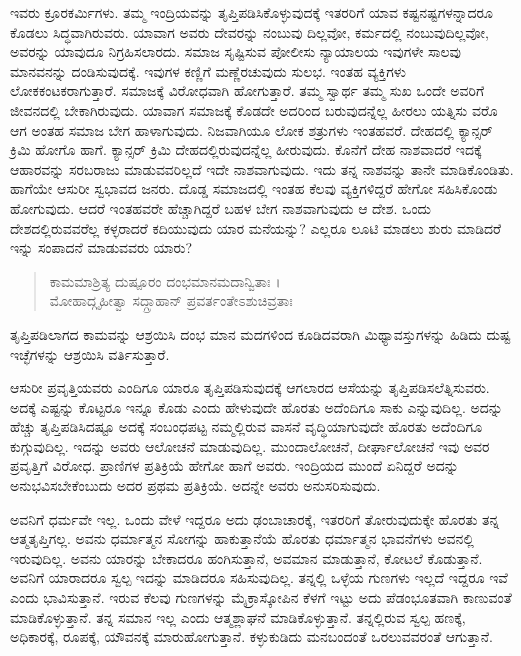 ಇವರು ಕ್ರೂರಕರ್ಮಿಗಳು. ತಮ್ಮ ಇಂದ್ರಿಯವನ್ನು ತೃಪ್ತಿಪಡಿಸಿಕೊಳ್ಳುವುದಕ್ಕೆ ಇತರರಿಗೆ ಯಾವ ಕಷ್ಟನಷ್ಟಗಳನ್ನಾದರೂ ಕೊಡಲು ಸಿದ್ಧವಾಗಿರುವರು. ಯಾವಾಗ ಅವರು ದೇವರನ್ನು ನಂಬುವು ದಿಲ್ಲವೋ, ಕರ್ಮದಲ್ಲಿ ನಂಬುವುದಿಲ್ಲವೋ, ಅವರನ್ನು ಯಾವುದೂ ನಿಗ್ರಹಿಸಲಾರದು. ಸಮಾಜ ಸೃಷ್ಟಿಸುವ ಪೋಲೀಸು ನ್ಯಾಯಾಲಯ ಇವುಗಳೇ ಸಾಲವು ಮಾನವನನ್ನು ದಂಡಿಸುವುದಕ್ಕೆ. ಇವುಗಳ ಕಣ್ಣಿಗೆ ಮಣ್ಣೆರಚುವುದು ಸುಲಭ. ಇಂತಹ ವ್ಯಕ್ತಿಗಳು ಲೋಕಕಂಟಕರಾಗುತ್ತಾರೆ. ಸಮಾಜಕ್ಕೆ ವಿರೋಧವಾಗಿ ಹೋಗುತ್ತಾರೆ. ತಮ್ಮ ಸ್ವಾರ್ಥ ತಮ್ಮ ಸುಖ ಒಂದೇ ಅವರಿಗೆ ಜೀವನದಲ್ಲಿ ಬೇಕಾಗಿರುವುದು. ಯಾವಾಗ ಸಮಾಜಕ್ಕೆ ಕೊಡದೇ ಅದರಿಂದ ಬರುವುದನ್ನೆಲ್ಲ ಹೀರಲು ಯತ್ನಿಸು ವರೊ ಆಗ ಅಂತಹ ಸಮಾಜ ಬೇಗ ಹಾಳಾಗುವುದು. ನಿಜವಾಗಿಯೂ ಲೋಕ ಶತ್ರುಗಳು ಇಂತಹವರೆ. ದೇಹದಲ್ಲಿ ಕ್ಯಾನ್ಸರ್ ಕ್ರಿಮಿ ಹೋಗೊ ಹಾಗೆ. ಕ್ಯಾನ್ಸರ್ ಕ್ರಿಮಿ ದೇಹದಲ್ಲಿರುವುದನ್ನೆಲ್ಲ ಹೀರುವುದು. ಕೊನೆಗೆ ದೇಹ ನಾಶವಾದರೆ ಇದಕ್ಕೆ ಆಹಾರವನ್ನು ಸರಬರಾಜು ಮಾಡುವವರಿಲ್ಲದೆ ಇದೇ ನಾಶವಾಗುವುದು. ಇದು ತನ್ನ ನಾಶವನ್ನು ತಾನೇ ಮಾಡಿಕೊಂಡಿತು. ಹಾಗೆಯೇ ಆಸುರೀ ಸ್ವಭಾವದ ಜನರು. ದೊಡ್ಡ ಸಮಾಜದಲ್ಲಿ ಇಂತಹ ಕೆಲವು ವ್ಯಕ್ತಿಗಳಿದ್ದರೆ ಹೇಗೋ ಸಹಿಸಿಕೊಂಡು ಹೋಗುವುದು. ಆದರೆ ಇಂತಹವರೇ ಹೆಚ್ಚಾಗಿದ್ದರೆ ಬಹಳ ಬೇಗ ನಾಶವಾಗುವುದು ಆ ದೇಶ. ಒಂದು ದೇಶದಲ್ಲಿರುವವರೆಲ್ಲ ಕಳ್ಳರಾದರೆ ಕದಿಯುವುದು ಯಾರ ಮನೆಯನ್ನು? ಎಲ್ಲರೂ ಲೂಟಿ ಮಾಡಲು ಶುರು ಮಾಡಿದರೆ ಇನ್ನು ಸಂಪಾದನೆ ಮಾಡುವವರು ಯಾರು?

\begin{verse}
ಕಾಮಮಾಶ್ರಿತ್ಯ ದುಷ್ಪೂರಂ ದಂಭಮಾನಮದಾನ್ವಿತಾಃ ।\\ಮೋಹಾದ್ಗೃಹೀತ್ವಾ ಸದ್ಗ್ರಾಹಾನ್ ಪ್ರವರ್ತಂತೇಽಶುಚಿವ್ರತಾಃ 
\end{verse}

{\small ತೃಪ್ತಿಪಡಿಲಾಗದ ಕಾಮವನ್ನು ಆಶ್ರಯಿಸಿ ದಂಭ ಮಾನ ಮದಗಳಿಂದ ಕೂಡಿದವರಾಗಿ ಮಿಥ್ಯಾವಸ್ತುಗಳನ್ನು ಹಿಡಿದು ದುಷ್ಟ ಇಚ್ಛೆಗಳನ್ನು ಆಶ್ರಯಿಸಿ ವರ್ತಿಸುತ್ತಾರೆ.}

ಆಸುರೀ ಪ್ರವೃತ್ತಿಯವರು ಎಂದಿಗೂ ಯಾರೂ ತೃಪ್ತಿಪಡಿಸುವುದಕ್ಕೆ ಆಗಲಾರದ ಆಸೆಯನ್ನು ತೃಪ್ತಿಪಡಿಸಲೆತ್ನಿಸುವರು. ಅದಕ್ಕೆ ಎಷ್ಟನ್ನು ಕೊಟ್ಟರೂ ಇನ್ನೂ ಕೊಡು ಎಂದು ಹೇಳುವುದೇ ಹೊರತು ಅದೆಂದಿಗೂ ಸಾಕು ಎನ್ನುವುದಿಲ್ಲ. ಅದನ್ನು ಹೆಚ್ಚು ತೃಪ್ತಿಪಡಿಸಿದಷ್ಟೂ ಅದಕ್ಕೆ ಸಂಬಂಧಪಟ್ಟ ನಮ್ಮಲ್ಲಿರುವ ವಾಸನೆ ವೃದ್ಧಿಯಾಗುವುದೇ ಹೊರತು ಅದೆಂದಿಗೂ ಕುಗ್ಗುವುದಿಲ್ಲ. ಇದನ್ನು ಅವರು ಆಲೋಚನೆ ಮಾಡುವುದಿಲ್ಲ. ಮುಂದಾಲೋಚನೆ, ದೀರ್ಘಾಲೋಚನೆ ಇವು ಅವರ ಪ್ರವೃತ್ತಿಗೆ ವಿರೋಧ. ಪ್ರಾಣಿಗಳ ಪ್ರತಿಕ್ರಿಯೆ ಹೇಗೋ ಹಾಗೆ ಅವರು. ಇಂದ್ರಿಯದ ಮುಂದೆ ಏನಿದ್ದರೆ ಅದನ್ನು ಅನುಭವಿಸಬೇಕೆಂಬುದು ಅದರ ಪ್ರಥಮ ಪ್ರತಿಕ್ರಿಯೆ. ಅದನ್ನೇ ಅವರು ಅನುಸರಿಸುವುದು.

ಅವನಿಗೆ ಧರ್ಮವೇ ಇಲ್ಲ. ಒಂದು ವೇಳೆ ಇದ್ದರೂ ಅದು ಢಂಬಾಚಾರಕ್ಕೆ, ಇತರರಿಗೆ ತೋರುವುದುಕ್ಕೇ ಹೊರತು ತನ್ನ ಆತ್ಮತೃಪ್ತಿಗಲ್ಲ. ಅವನು ಧರ್ಮಾತ್ಮನ ಸೋಗನ್ನು ಹಾಕುತ್ತಾನೆಯೆ ಹೊರತು ಧರ್ಮಾತ್ಮನ ಭಾವನೆಗಳು ಅವನಲ್ಲಿ ಇರುವುದಿಲ್ಲ. ಅವನು ಯಾರನ್ನು ಬೇಕಾದರೂ ಹಂಗಿಸುತ್ತಾನೆ, ಅವಮಾನ ಮಾಡುತ್ತಾನೆ, ಕೋಟಲೆ ಕೊಡುತ್ತಾನೆ. ಅವನಿಗೆ ಯಾರಾದರೂ ಸ್ವಲ್ಪ ಇದನ್ನು ಮಾಡಿದರೂ ಸಹಿಸುವುದಿಲ್ಲ. ತನ್ನಲ್ಲಿ ಒಳ್ಳೆಯ ಗುಣಗಳು ಇಲ್ಲದೆ ಇದ್ದರೂ ಇವೆ ಎಂದು ಭಾವಿಸುತ್ತಾನೆ. ಇರುವ ಕೆಲವು ಗುಣಗಳನ್ನು ಮೈಕ್ರಾಸ್ಕೋಪಿನ ಕೆಳಗೆ ಇಟ್ಟು ಅದು ಪೆಡಂಭೂತವಾಗಿ ಕಾಣುವಂತೆ ಮಾಡಿಕೊಳ್ಳುತ್ತಾನೆ. ತನ್ನ ಸಮಾನ ಇಲ್ಲ ಎಂದು ಆತ್ಮಶ್ಲಾಘನೆ ಮಾಡಿಕೊಳ್ಳುತ್ತಾನೆ. ತನ್ನಲ್ಲಿರುವ ಸ್ವಲ್ಪ ಹಣಕ್ಕೆ, ಅಧಿಕಾರಕ್ಕೆ, ರೂಪಕ್ಕೆ, ಯೌವನಕ್ಕೆ ಮಾರುಹೋಗುತ್ತಾನೆ. ಕಳ್ಳುಕುಡಿದು ಮನಬಂದಂತೆ ಒರಲುವವರಂತೆ ಆಗುತ್ತಾನೆ.

